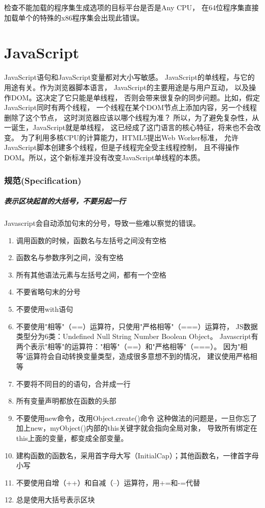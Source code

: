 \documentclass{book}
\begin{document}
检查不能加载的程序集生成选项的目标平台是否是Any CPU，
在64位程序集直接加载单个的特殊的x86程序集会出现此错误。

\chapter{JavaScript}

\clearpage
\mbox{}         
\clearpage

JavaScript语句和JavaScript变量都对大小写敏感。
JavaScript的单线程，与它的用途有关。作为浏览器脚本语言，
JavaScript的主要用途是与用户互动，
以及操作DOM。这决定了它只能是单线程，
否则会带来很复杂的同步问题。比如，假定JavaScript同时有两个线程，
一个线程在某个DOM节点上添加内容，另一个线程删除了这个节点，
这时浏览器应该以哪个线程为准？
所以，为了避免复杂性，从一诞生，JavaScript就是单线程，
这已经成了这门语言的核心特征，将来也不会改变。
为了利用多核CPU的计算能力，HTML5提出Web Worker标准，
允许JavaScript脚本创建多个线程，但是子线程完全受主线程控制，
且不得操作DOM。所以，这个新标准并没有改变JavaScript单线程的本质。

\subsection{规范(Specification)}

\paragraph{表示区块起首的大括号，不要另起一行}

Javascript会自动添加句末的分号，导致一些难以察觉的错误。

\begin{enumerate}
\setcounter{enumi}{0}
\item{调用函数的时候，函数名与左括号之间没有空格}
\item{函数名与参数序列之间，没有空格}
\item{所有其他语法元素与左括号之间，都有一个空格}
\item{不要省略句末的分号}
\item{不要使用with语句}
\item{不要使用"相等"（==）运算符，只使用"严格相等"（===）运算符，
JS数据类型分为6类：Undefined Null String Number Boolean Object。
Javascript有两个表示"相等"的运算符："相等"（==）和"严格相等"（===）。
因为"相等"运算符会自动转换变量类型，造成很多意想不到的情况，
建议使用严格相等}
\item{不要将不同目的的语句，合并成一行}
\item{所有变量声明都放在函数的头部}
\item{不要使用new命令，改用Object.create()命令}
这种做法的问题是，一旦你忘了加上new，myObject()内部的this关键字就会指向全局对象，
导致所有绑定在this上面的变量，都变成全部变量。
\item{建构函数的函数名，采用首字母大写（InitialCap）；其他函数名，一律首字母小写}
\item{不要使用自增（++）和自减（--）运算符，用+=和-=代替}
\item{总是使用大括号表示区块}
\end{enumerate}
\end{document}
